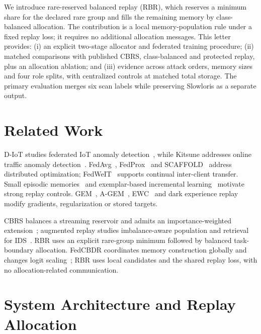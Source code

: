 \documentclass[journal,10pt]{IEEEtran}
\begin{document}
We introduce rare-reserved balanced replay (RBR), which reserves a minimum share for the declared rare group and fills the remaining memory by class-balanced allocation. The contribution is a local memory-population rule under a fixed replay loss; it requires no additional allocation messages. This letter provides: (i) an explicit two-stage allocator and federated training procedure; (ii) matched comparisons with published CBRS, class-balanced and protected replay, plus an allocation ablation; and (iii) evidence across attack orders, memory sizes and four role splits, with centralized controls at matched total storage. The primary evaluation merges six scan labels while preserving Slowloris as a separate output.

\section{Related Work}
D-IoT studies federated IoT anomaly detection~\cite{diot}, while Kitsune addresses online traffic anomaly detection~\cite{kitsune}. FedAvg~\cite{fedavg}, FedProx~\cite{fedprox} and SCAFFOLD~\cite{scaffold} address distributed optimization; FedWeIT~\cite{fedweit} supports continual inter-client transfer. Small episodic memories~\cite{tiny} and exemplar-based incremental learning~\cite{icarl} motivate strong replay controls. GEM~\cite{gem}, A-GEM~\cite{agem}, EWC~\cite{ewc} and dark experience replay~\cite{der} modify gradients, regularization or stored targets.

CBRS balances a streaming reservoir and admits an importance-weighted extension~\cite{cbrs}; augmented replay studies imbalance-aware population and retrieval for IDS~\cite{amr}. RBR uses an explicit rare-group minimum followed by balanced task-boundary allocation. FedCBDR coordinates memory construction globally and changes logit scaling~\cite{fedcbdr}; RBR uses local candidates and the shared replay loss, with no allocation-related communication.

\section{System Architecture and Replay Allocation}
\end{document}
